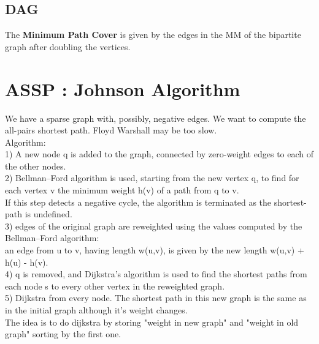 \subsection{DAG}
The \textbf{Minimum Path Cover} is given by the edges in the MM of the bipartite graph after doubling the vertices.
\section{ASSP : Johnson Algorithm}
We have a sparse graph with, possibly, negative edges. We want to compute the all-pairs shortest path. Floyd Warshall may be too slow.\\
Algorithm: \\
1) A new node q is added to the graph, connected by zero-weight edges to each of the other nodes.\\
2) Bellman–Ford algorithm is used, starting from the new vertex q, to find for each vertex v the minimum weight h(v) of a path from q to v. \\
If this step detects a negative cycle, the algorithm is terminated as the shortest-path is undefined.\\
3) edges of the original graph are reweighted using the values computed by the Bellman–Ford algorithm: \\
an edge from u to v, having length w(u,v), is given by the new length w(u,v) + h(u) - h(v).\\
4) q is removed, and Dijkstra's algorithm is used to find the shortest paths from each node s to every other vertex in the reweighted graph.\\
5) Dijkstra from every node. The shortest path in this new graph is the same as in the initial graph although it's weight changes.\\
The idea is to do dijkstra by storing "weight in new graph" and "weight in old graph" sorting by the first one.\\

